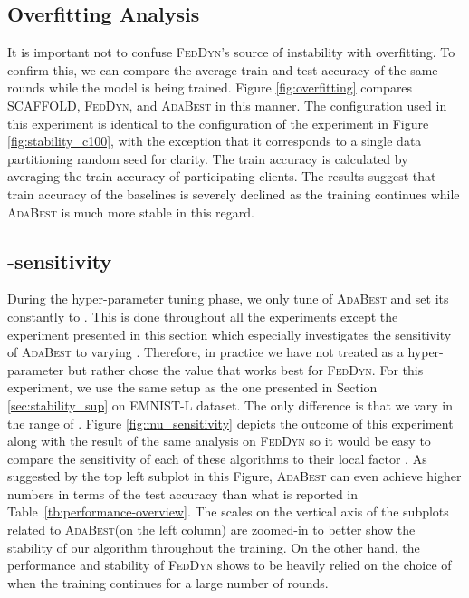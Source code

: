 \documentclass[runningheads]{llncs}
\def\tableref#1{Table~\ref{#1}}
\newcommand{\scaffold}{\textsc{SCAFFOLD}\xspace}
\newcommand{\feddyn}{\textsc{FedDyn}\xspace}
\newcommand{\ours}{\textsc{AdaBest}\xspace}
\def\emnist{{\textsc{EMNIST-L}}}
\begin{document}
\subsection{Overfitting Analysis}
It is important not to confuse \feddyn's source of instability with overfitting. To confirm this, we can compare the average train and test accuracy of the same rounds while the model is being trained. Figure \ref{fig:overfitting} compares \scaffold, \feddyn, and \ours in this manner. The configuration used in this experiment is identical to the configuration of the experiment in Figure \ref{fig:stability_c100}, with the exception that it corresponds to a single data partitioning random seed for clarity. The train accuracy is calculated by averaging the train accuracy of participating clients. The results suggest that train accuracy of the baselines is severely declined as the training continues while \ours is much more stable in this regard.


\subsection{-sensitivity}

During the hyper-parameter tuning phase, we only tune  of \ours and set its  constantly to . This is done throughout all the experiments except the experiment presented in this section which especially investigates the sensitivity of \ours to varying . Therefore, in practice we have not treated  as a hyper-parameter but rather chose the value that works best for \feddyn. For this experiment, we use the same setup as the one presented in Section \ref{sec:stability_sup} on \emnist{} dataset. The only difference is that we vary  in the range of . Figure \ref{fig:mu_sensitivity} depicts the outcome of this experiment along with the result of the same analysis on \feddyn so it would be easy to compare the sensitivity of each of these algorithms to their local factor . As suggested by the top left subplot in this Figure, \ours can even achieve higher numbers in terms of the test accuracy than what is reported in \tableref{tb:performance-overview}. The scales on the vertical axis of the subplots related to \ours (on the left column) are zoomed-in to better show the stability of our algorithm throughout the training. On the other hand, the performance and stability of \feddyn shows to be heavily relied on the choice of  when the training continues for a large number of rounds. 
\end{document}
